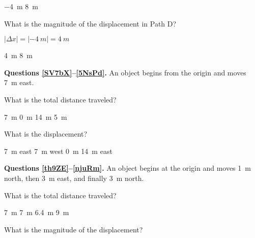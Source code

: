 \documentclass[answers]{exam}
\begin{document}
\begin{questions}
\smallskip
\fi


\begin{randomizechoices}
    \correctchoice \SI{-4}{m}
    \choice \SI{8}{m}
\end{randomizechoices}



\question \label{ghgjl}
What is the magnitude of the displacement in Path D?

\ifprintanswers
{\color{red} 
$ \left|\Delta x\right| = \left|-\SI{4}{m}\right| = \boxed{\SI{4}{m}}$
}

\smallskip
\fi

\begin{randomizechoices}
    \correctchoice \SI{4}{m}
    \choice \SI{8}{m}
\end{randomizechoices}


\begin{EnvUplevel}
    \textbf{Questions \ref{SV7bX}--\ref{5NsPd}.} An object begins from the origin and moves \SI{7}{m} east.
\end{EnvUplevel}

\question \label{SV7bX}
What is the total distance traveled?

\begin{randomizechoices}
    \correctchoice \SI{7}{m}
    \choice \SI{0}{m}
    \choice \SI{14}{m}
    \choice \SI{5}{m}
\end{randomizechoices}

\question \label{5NsPd}
What is the displacement?

\begin{randomizechoices}
    \correctchoice \SI{7}{m} east
    \choice \SI{7}{m} west
    \choice \SI{0}{m}
    \choice \SI{14}{m} east
\end{randomizechoices}

\begin{EnvUplevel}
    \textbf{Questions \ref{th9ZE}--\ref{njuRm}.} An object begins at the origin and moves \SI{1}{m} north, then \SI{3}{m} east, and finally \SI{3}{m} north.
\end{EnvUplevel}


\question \label{th9ZE}
What is the total distance traveled?

\begin{randomizechoices}
    \correctchoice \SI{7}{m}
    \choice \SI{7}{m}
    \choice \SI{6.4}{m}
    \choice \SI{9}{m}
\end{randomizechoices}

\question
What is the magnitude of the displacement?


\end{questions}
\end{document}
